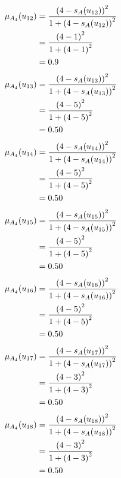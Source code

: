 \documentclass[a4paper]{book}
\begin{document}
				\begin{align}
					\mu_{A_4}(u_{12}) &= \frac{\left(4-s_A(u_{12})\right)^2}{1 + \left(4-s_A(u_{12})\right)^2}\\
					&= \frac{\left(4-1\right)^2}{1 + \left(4-1\right)^2} \notag \\
					&= 0.9 \notag
				\end{align}
				\begin{align}
					\mu_{A_4}(u_{13}) &= \frac{\left(4-s_A(u_{13})\right)^2}{1 + \left(4-s_A(u_{13})\right)^2}\\
					&= \frac{\left(4-5\right)^2}{1 + \left(4-5\right)^2} \notag \\
					&= 0.50 \notag
				\end{align}
				\begin{align}
					\mu_{A_4}(u_{14}) &= \frac{\left(4-s_A(u_{14})\right)^2}{1 + \left(4-s_A(u_{14})\right)^2}\\
					&= \frac{\left(4-5\right)^2}{1 + \left(4-5\right)^2} \notag \\
					&= 0.50 \notag
				\end{align}
				\begin{align}
					\mu_{A_4}(u_{15}) &= \frac{\left(4-s_A(u_{15})\right)^2}{1 + \left(4-s_A(u_{15})\right)^2}\\
					&= \frac{\left(4-5\right)^2}{1 + \left(4-5\right)^2} \notag \\
					&= 0.50 \notag
				\end{align}
				\begin{align}
					\mu_{A_4}(u_{16}) &= \frac{\left(4-s_A(u_{16})\right)^2}{1 + \left(4-s_A(u_{16})\right)^2}\\
					&= \frac{\left(4-5\right)^2}{1 + \left(4-5\right)^2} \notag \\
					&= 0.50 \notag
				\end{align}
				\begin{align}
					\mu_{A_4}(u_{17}) &= \frac{\left(4-s_A(u_{17})\right)^2}{1 + \left(4-s_A(u_{17})\right)^2}\\
					&= \frac{\left(4-3\right)^2}{1 + \left(4-3\right)^2} \notag \\
					&= 0.50 \notag
				\end{align}
				\begin{align}
					\mu_{A_4}(u_{18}) &= \frac{\left(4-s_A(u_{18})\right)^2}{1 + \left(4-s_A(u_{18})\right)^2}\\
					&= \frac{\left(4-3\right)^2}{1 + \left(4-3\right)^2} \notag \\
					&= 0.50 \notag
				\end{align}
\end{document}
